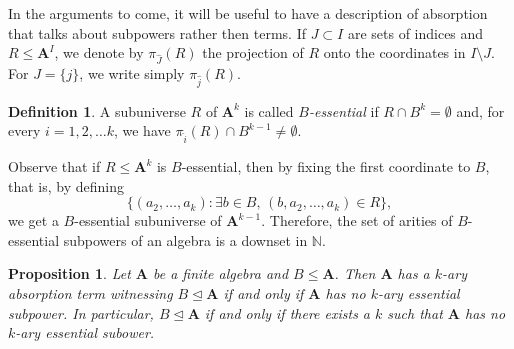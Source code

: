 \documentclass{amsart}
\theoremstyle{plain}
\newtheorem{proposition}[theorem]{Proposition}
\theoremstyle{definition}
\newtheorem{definition}[theorem]{Definition}
\begin{document}
In the arguments to come, it will be useful to have a description of
absorption that talks about subpowers rather then terms. 
If $J\subset I$ are sets of indices and $R\leq {{\mathbf{A}}}^I$, we denote by $\pi_{\widehat J}(R)$ 
the projection of $R$ onto the coordinates in $I\setminus J$. For $J = \{j\}$,
we write simply $\pi_{\widehat j}(R)$.

\begin{definition}
A subuniverse $R$ of ${{\mathbf{A}}}^k$ is called \emph{$B$-essential} if $R\cap B^k=\emptyset$ and, for every $i=1,2,\dots k$, 
we have $\pi_{\widehat i} (R)\cap B^{k-1}\neq \emptyset$.
\end{definition}

Observe that if $R \leq {{\mathbf{A}}}^k$ is $B$-essential, then by fixing the first coordinate to $B$, that is, by defining
\[
\{(a_2, \dots, a_k) \colon \exists b \in B,\, (b,a_2, \dots, a_k) \in R\},
\] 
we get a $B$-essential subuniverse of ${{\mathbf{A}}}^{k-1}$.  
Therefore, the set of arities of $B$-essential subpowers of an algebra is a downset in $\mathbb{N}$.

\begin{proposition}\label{propEssentialRel}
Let ${{\mathbf{A}}}$ be a finite algebra and $B \leq {{\mathbf{A}}}$. Then ${{\mathbf{A}}}$ has a $k$-ary
absorption term witnessing $B\operatorname{\trianglelefteq}{{\mathbf{A}}}$ if and only if ${{\mathbf{A}}}$ has no $k$-ary essential
subpower. In particular, $B\operatorname{\trianglelefteq}{{\mathbf{A}}}$ if and only if there exists a $k$
such that ${{\mathbf{A}}}$ has no $k$-ary essential subower.
\end{proposition}
\end{document}
